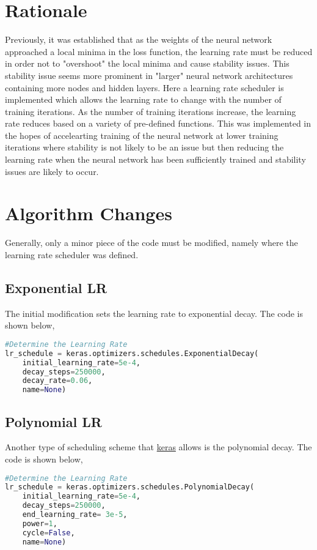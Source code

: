 \documentclass[a4paper, 12pt]{report}
\begin{document}
\begin{center}
\section{Rationale}
\begin{comment}
\end{comment}
Previously, it was established that as the weights of the neural network approached a local minima in the loss function, the learning rate must be reduced in order not to "overshoot" the local minima and cause stability issues. This stability issue seems more prominent in "larger" neural network architectures containing more nodes and hidden layers. Here a learning rate scheduler is implemented which allows the learning rate to change with the number of training iterations. As the number of training iterations increase, the learning rate reduces based on a variety of pre-defined functions. This was implemented in the hopes of accelearting training of the neural network at lower training iterations where stability is not likely to be an issue but then reducing the learning rate when the neural network has been sufficiently trained and stability issues are likely to occur. 
\section{Algorithm Changes}
\begin{comment}
\end{comment}
Generally, only a minor piece of the code must be modified, namely where the learning rate scheduler was defined.
\subsection{Exponential LR}
\begin{comment}
\end{comment}
The initial modification sets the learning rate to exponential decay. The code is shown below,
\begin{lstlisting}[language=python]
#Determine the Learning Rate
lr_schedule = keras.optimizers.schedules.ExponentialDecay(
    initial_learning_rate=5e-4,
    decay_steps=250000,
    decay_rate=0.06,
    name=None)
\end{lstlisting}
\subsection{Polynomial LR}
\begin{comment}
\end{comment}
Another type of scheduling scheme that \url{keras} allows is the polynomial decay. The code is shown below,
\begin{lstlisting}[language=python]
#Determine the Learning Rate
lr_schedule = keras.optimizers.schedules.PolynomialDecay(
    initial_learning_rate=5e-4,
    decay_steps=250000,
    end_learning_rate= 3e-5,
    power=1,
    cycle=False,
    name=None)
\end{lstlisting}


\end{center}
\end{document}

